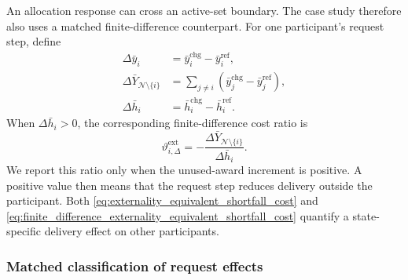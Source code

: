 \documentclass[twoside,twocolumn,9pt]{article}
\begin{document}
{An allocation response can cross an active-set boundary. The case study
therefore also uses a matched finite-difference counterpart. For one participant's
request step, define
\begin{align*}
\Delta\bar y_i&=\bar y_i^{\mathrm{chg}}-\bar y_i^{\mathrm{ref}},\\
\Delta\bar Y_{\mathcal N\setminus\{i\}}
&=\sum_{j\ne i}(\bar y_j^{\mathrm{chg}}-\bar y_j^{\mathrm{ref}}),\\
\Delta\bar h_i&=\bar h_i^{\mathrm{chg}}-\bar h_i^{\mathrm{ref}}.
\end{align*}
When $\Delta\bar h_i>0$, the corresponding finite-difference cost ratio is
\begin{equation}
\vartheta_{i,\Delta}^{\mathrm{ext}}
=-\frac{\Delta\bar Y_{\mathcal N\setminus\{i\}}}{\Delta\bar h_i}.
\label{eq:finite_difference_externality_equivalent_shortfall_cost}
\end{equation}
We report this ratio only when the unused-award increment is positive. A
positive value then means that the request step reduces delivery outside the
participant. Both
\eqref{eq:externality_equivalent_shortfall_cost} and
\eqref{eq:finite_difference_externality_equivalent_shortfall_cost} quantify a
state-specific delivery effect on other participants.

\subsubsection{Matched classification of request effects}

}
\end{document}
